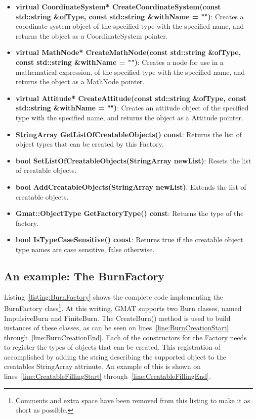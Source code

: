 \begin{itemize}
{\&withName = "")}:  Creates an axis system as used in the coordimate system classes, of the
specified type with the specified name, and returns the object as an AxisSystem pointer.
\item \textbf{virtual CoordinateSystem* CreateCoordinateSystem(const std::string \&ofType, const
std::string \&withName = "")}:  Creates a coordinate system object of the specified type with the
specified name, and returns the object as a CoordinateSystem pointer.
\item \textbf{virtual MathNode* CreateMathNode(const std::string \&ofType, const std::string
\&withName = "")}:  Creates a node for use in a mathematical expression, of the specified type with
the specified name, and returns the object as a MathNode pointer.
\item \textbf{virtual Attitude* CreateAttitude(const std::string \&ofType, const std::string
\&withName = "")}:  Creates an attitude object of the specified type with the specified name, and
returns the object as a Attitude pointer.
\item \textbf{StringArray GetListOfCreatableObjects() const}: Returns the list of object types that
can be created by this Factory.
\item \textbf{bool SetListOfCreatableObjects(StringArray newList)}: Resets the list of creatable
objects.
\item \textbf{bool AddCreatableObjects(StringArray newList)}: Extends the list of creatable
objects.
\item \textbf{Gmat::ObjectType GetFactoryType() const}: Returns the type of the factory.
\item \textbf{bool IsTypeCaseSensitive() const}: Returns true if the creatable object type names
are case sensitive, false otherwise.
\end{itemize}

\subsection{An example: The BurnFactory}

Listing~\ref{listing:BurnFactory} shows the complete code implementing the BurnFactory
class\footnote{Comments and extra space have been removed from this listing to make it as short as
possible.}.  At this writing, GMAT supports two Burn classes, named ImpulsiveBurn and FiniteBurn.
The CreateBurn() method is used to build instances of these classes, as can be seen on
lines~\ref{line:BurnCreationStart} through~\ref{line:BurnCreationEnd}.  Each of the constructors for
the Factory needs to register the types of objects that can be created.  This registration of
accomplished by adding the string describing the supported object to the creatables StringArray
attrinute.  An example of this is shown on lines~\ref{line:CreatableFillingStart}
through~\ref{line:CreatableFillingEnd}.\\

